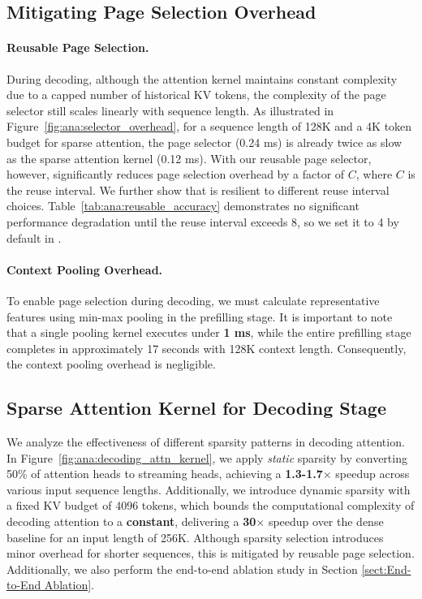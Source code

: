 \subsection{Mitigating Page Selection Overhead}




\paragraph{Reusable Page Selection.} During decoding, although the attention kernel maintains constant complexity due to a capped number of historical KV tokens, the complexity of the page selector still scales linearly with sequence length. As illustrated in Figure~\ref{fig:ana:selector_overhead}, for a sequence length of 128K and a 4K token budget for sparse attention, the page selector (0.24 ms) is already twice as slow as the sparse attention kernel (0.12 ms). With our reusable page selector, however, \system significantly reduces page selection overhead by a factor of $C$, where $C$ is the reuse interval. We further show that \system is resilient to different reuse interval choices. Table~\ref{tab:ana:reusable_accuracy} demonstrates no significant performance degradation until the reuse interval exceeds 8, so we set it to 4 by default in \system.

\paragraph{Context Pooling Overhead.} To enable page selection during decoding, we must calculate representative features using min-max pooling in the prefilling stage. It is important to note that a single pooling kernel executes under \textbf{1 ms}, while the entire prefilling stage completes in approximately 17 seconds with 128K context length. Consequently, the context pooling overhead is negligible.

\subsection{Sparse Attention Kernel for Decoding Stage}




We analyze the effectiveness of different sparsity patterns in decoding attention. In Figure~\ref{fig:ana:decoding_attn_kernel}, we apply \textit{static} sparsity by converting 50\% of attention heads to streaming heads, achieving a \textbf{1.3-1.7$\times$} speedup across various input sequence lengths. Additionally, we introduce dynamic sparsity with a fixed KV budget of 4096 tokens, which bounds the computational complexity of decoding attention to a \textbf{constant}, delivering a \textbf{30$\times$} speedup over the dense baseline for an input length of 256K.  Although sparsity selection introduces minor overhead for shorter sequences, this is mitigated by reusable page selection. Additionally, we also perform the end-to-end ablation study in Section \ref{sect:End-to-End Ablation}.



